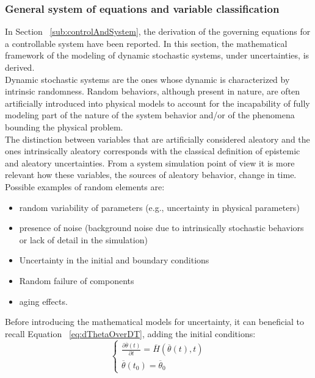 \subsubsection{General system of equations and variable classification}
\label{subsub:generalSystemOfEqAndVarsClassification}
In Section ~\ref{sub:controlAndSystem}, the derivation of the governing equations for a controllable system
have been reported. In this section, the mathematical framework of the modeling of dynamic stochastic systems,
under uncertainties, is derived.
\\ Dynamic stochastic systems are the ones whose dynamic is characterized by intrinsic randomness. Random
behaviors, although present in nature, are often artificially introduced into physical models to account for the
incapability of fully modeling part of the nature of the system behavior and/or of the phenomena bounding the
physical problem.
\\The distinction between variables that are artificially considered aleatory and the ones intrinsically aleatory
corresponds with the classical definition of epistemic and aleatory uncertainties. From a
system simulation point of view it is more relevant how these variables, the sources of aleatory behavior, change
in time.
Possible examples of random elements are:
\begin{itemize}
 \item random variability of parameters (e.g., uncertainty in physical parameters)
 \item presence of noise (background noise due to intrinsically stochastic behaviors or lack of detail in the
 simulation)
 \item Uncertainty in the initial and boundary conditions
 \item Random failure of components
 \item aging effects.
\end{itemize}
Before introducing the mathematical models for uncertainty,  it can beneficial to recall
Equation ~\ref{eq:dThetaOverDT}, adding the initial conditions:
\begin{equation}
\label{eq:dThetaOverDTWithBoundary}
\left\{\begin{matrix}
\frac{\partial  \overline{\theta}\left ( t \right )}{\partial t}=\overline{H}\left (  \overline{\theta}\left ( t \right ),t \right ) \\
 \overline{\theta}\left ( t_{0} \right ) = \overline{\theta}_{0}
\end{matrix}\right.
\end{equation}
